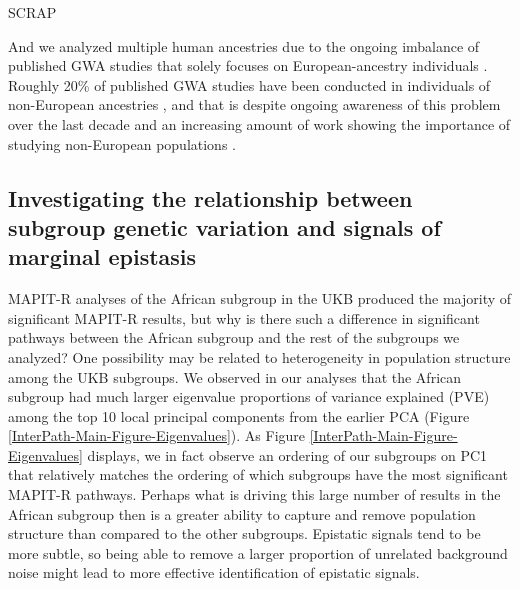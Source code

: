 \documentclass[10pt,a4paper]{article}
\begin{document}
\iffalse

SCRAP


And we analyzed multiple human ancestries due to the ongoing imbalance of published GWA studies that solely focuses on European-ancestry individuals \citep{Need2009,Popejoy2016,Gurdasani2019,Martin2019,Sirugo2019}. Roughly 20\% of published GWA studies have been conducted in individuals of non-European ancestries \citep{Gurdasani2019,Martin2019,Sirugo2019}, and that is despite ongoing awareness of this problem over the last decade \citep{Need2009,Popejoy2016} and an increasing amount of work showing the importance of studying non-European populations \citep{Dumitrescu2011,Martin2017a,Martin2017b,Mogil2018,Bien2019,Duncan2019,Kuchenbaecker2019,Wojcik2019,Zhong2019,Marnetto2020,Mostafavi2020}.


\subsection{Investigating the relationship between subgroup genetic variation and signals of marginal epistasis}

MAPIT-R analyses of the African subgroup in the UKB produced the majority of significant MAPIT-R results, but why is there such a difference in significant pathways between the African subgroup and the rest of the subgroups we analyzed? One possibility may be related to heterogeneity in population structure among the UKB subgroups. We observed in our analyses that the African subgroup had much larger eigenvalue proportions of variance explained (PVE) among the top 10 local principal components from the earlier PCA (Figure \ref{InterPath-Main-Figure-Eigenvalues}). As Figure \ref{InterPath-Main-Figure-Eigenvalues} displays, we in fact observe an ordering of our subgroups on PC1 that relatively matches the ordering of which subgroups have the most significant MAPIT-R pathways. Perhaps what is driving this large number of results in the African subgroup then is a greater ability to capture and remove population structure than compared to the other subgroups. Epistatic signals tend to be more subtle, so being able to remove a larger proportion of unrelated background noise might lead to more effective identification of epistatic signals. 
\end{document}
